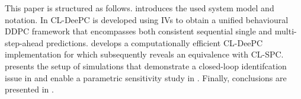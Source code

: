 This paper is structured as follows.  introduces the used system model and notation. In  \ac{CL-DeePC} is developed using \ac{IVs} to obtain a unified behavioural \ac{DDPC} framework that encompasses both consistent sequential single and multi-step-ahead predictions.  develops a computationally efficient \ac{CL-DeePC} implementation for which  subsequently reveals an equivalence with \ac{CL-SPC}.  presents the setup of simulations that demonstrate a closed-loop identifcation issue in  and enable a parametric sensitivity study in . Finally, conclusions are presented in .

%
